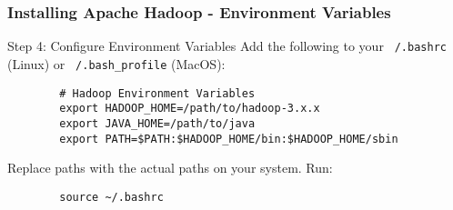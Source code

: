 \documentclass{beamer}
\begin{document}
\begin{frame}[fragile]
    \frametitle{Installing Apache Hadoop - Environment Variables}
    \begin{block}{Step 4: Configure Environment Variables}
        Add the following to your \texttt{~/.bashrc} (Linux) or \texttt{~/.bash_profile} (MacOS):
        \begin{lstlisting}
        # Hadoop Environment Variables
        export HADOOP_HOME=/path/to/hadoop-3.x.x
        export JAVA_HOME=/path/to/java
        export PATH=$PATH:$HADOOP_HOME/bin:$HADOOP_HOME/sbin
        \end{lstlisting}
        Replace paths with the actual paths on your system. Run:
        \begin{lstlisting}
        source ~/.bashrc
        \end{lstlisting}
    \end{block}
\end{frame}
\end{document}
